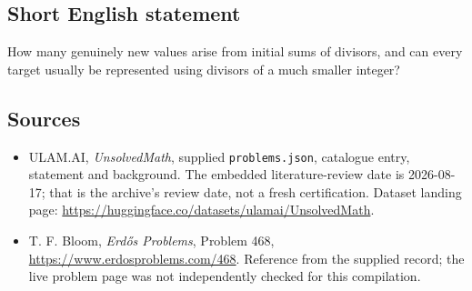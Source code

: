 \documentclass[11pt,a4paper]{article}
\begin{document}
\subsection{Short English statement}

How many genuinely new values arise from initial sums of divisors, and can every target usually be represented using divisors of a much smaller integer?

\subsection{Sources}

{\small

\begin{itemize}

\item[\hypertarget{source:statement:1}{S1}] ULAM.AI, \emph{UnsolvedMath}, supplied \texttt{problems.json}, catalogue entry, statement and background. The embedded literature-review date is 2026-08-17; that is the archive’s review date, not a fresh certification. Dataset landing page: \url{https://huggingface.co/datasets/ulamai/UnsolvedMath}.

\item[\hypertarget{source:statement:2}{S2}] T. F. Bloom, \emph{Erdős Problems}, Problem 468, \url{https://www.erdosproblems.com/468}. Reference from the supplied record; the live problem page was not independently checked for this compilation.

\end{itemize}

}

\label{end:statement}
\end{document}
